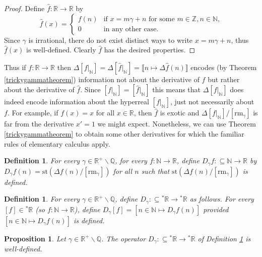 \documentclass[microtype]{jloganal}
\newtheorem{proposition}[theorem]{Proposition}
\newtheorem{definition}[theorem]{Definition}
\def\RM{\mathrm{rm}}
\begin{document}
\begin{proof}
    Define $\hat f:\mathbb R\to\mathbb R$ by
    \[
        \hat f(x) =
        \begin{cases}
            f(n) & \mbox{if $x=m\gamma+n$ for some $m\in\mathbb Z, n\in\mathbb N$,}\\
            0 &\mbox{in any other case.}
        \end{cases}
    \]
    Since $\gamma$ is irrational, there do not exist distinct ways to write
    $x=m\gamma+n$, thus $\hat f(x)$ is well-defined.
    Clearly $\hat f$ has the desired properties.
\end{proof}

Thus if $f:\mathbb R\to\mathbb R$
then
$\Delta[f|_\mathbb N]
=\Delta[\hat f|_\mathbb N]
=\llbracket n\mapsto \Delta \hat f(n)\rrbracket$
encodes (by Theorem \ref{trickygammatheorem})
information not about the derivative of $f$ but rather about the
derivative of $\hat f$. Since $[f|_\mathbb N]=[\hat f|_\mathbb N]$
this means that $\Delta[f|_\mathbb N]$
does indeed encode information about the hyperreal
$[f|_\mathbb N]$, just not necessarily about $f$.
For example, if $f(x)=x$ for all $x\in \mathbb R$,
then $\hat f$ is exotic and $\Delta[f|_\mathbb N]/[\RM_\gamma]$ is far from
the derivative $x'=1$ we might expect.
Nonetheless, we can use Theorem \ref{trickygammatheorem} to obtain
some other derivatives for which the familiar rules of elementary
calculus apply.

\begin{definition}
\label{Dgammadefn}
    For every $\gamma\in\mathbb R^+\backslash \mathbb Q$,
    for every $f:\mathbb N\to\mathbb R$,
    define $D_\gamma f:{\subseteq}\mathbb N\to\mathbb R$ by
    $D_\gamma f(n) = \mathrm{st}(\Delta f(n)/[\RM_\gamma])$
    for all $n$ such that $\mathrm{st}(\Delta f(n)/[\RM_\gamma])$
    is defined.
\end{definition}

\begin{definition}
\label{factorthroughstdefn}
    For every $\gamma\in\mathbb R^+\backslash\mathbb Q$,
    define $D_\gamma:{\subseteq}{}^*\mathbb R\to{}^*\mathbb R$
    as follows.
    For every $[f]\in{}^*\mathbb R$
    (so $f:\mathbb N\to\mathbb R$),
    define $D_\gamma[f]=[n\in\mathbb N\mapsto D_\gamma f(n)]$
    provided $[n\in\mathbb N\mapsto D_\gamma f(n)]$ is defined.
\end{definition}

\begin{proposition}
    Let $\gamma\in\mathbb R^+\backslash \mathbb Q$.
    The operator $D_\gamma:{\subseteq}{}^*\mathbb R\to{}^*\mathbb R$
    of Definition \ref{factorthroughstdefn} is well-defined.
\end{proposition}
\end{document}
